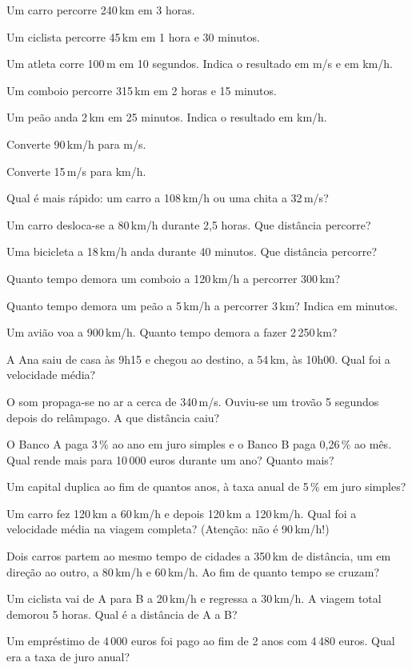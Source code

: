 \documentclass[12pt]{article}
\begin{document}
\begin{exercicios}
  \item Um carro percorre 240\,km em 3 horas.
  \item Um ciclista percorre 45\,km em 1 hora e 30 minutos.
  \item Um atleta corre 100\,m em 10 segundos. Indica o resultado em m/s e em km/h.
  \item Um comboio percorre 315\,km em 2 horas e 15 minutos.
  \item Um peão anda 2\,km em 25 minutos. Indica o resultado em km/h.
  \item Converte 90\,km/h para m/s.
  \item Converte 15\,m/s para km/h.
  \item Qual é mais rápido: um carro a 108\,km/h ou uma chita a 32\,m/s?
\end{exercicios}

\begin{exercicios}
  \item Um carro desloca-se a 80\,km/h durante 2,5 horas. Que distância percorre?
  \item Uma bicicleta a 18\,km/h anda durante 40 minutos. Que distância percorre?
  \item Quanto tempo demora um comboio a 120\,km/h a percorrer 300\,km?
  \item Quanto tempo demora um peão a 5\,km/h a percorrer 3\,km? Indica em minutos.
  \item Um avião voa a 900\,km/h. Quanto tempo demora a fazer 2\,250\,km?
  \item A Ana saiu de casa às 9h15 e chegou ao destino, a 54\,km, às 10h00. Qual foi a velocidade média?
  \item O som propaga-se no ar a cerca de 340\,m/s. Ouviu-se um trovão 5 segundos depois do relâmpago. A que distância caiu?
\end{exercicios}

\begin{exercicios}
  \item O Banco A paga 3\,\% ao ano em juro simples e o Banco B paga 0,26\,\% ao mês. Qual rende mais para 10\,000 euros durante um ano? Quanto mais?
  \item Um capital duplica ao fim de quantos anos, à taxa anual de 5\,\% em juro simples?
  \item Um carro fez 120\,km a 60\,km/h e depois 120\,km a 120\,km/h. Qual foi a velocidade média na viagem completa? (Atenção: não é 90\,km/h!)
  \item Dois carros partem ao mesmo tempo de cidades a 350\,km de distância, um em direção ao outro, a 80\,km/h e 60\,km/h. Ao fim de quanto tempo se cruzam?
  \item Um ciclista vai de A para B a 20\,km/h e regressa a 30\,km/h. A viagem total demorou 5 horas. Qual é a distância de A a B?
  \item Um empréstimo de 4\,000 euros foi pago ao fim de 2 anos com 4\,480 euros. Qual era a taxa de juro anual?
\end{exercicios}
\end{document}
